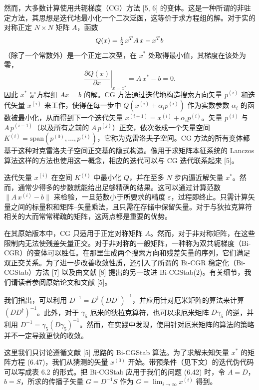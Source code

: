 然而，大多数计算使用共轭梯度（CG）方法 [5, 6] 的变体。这是一种所谓的非驻定方法，其思想是迭代地最小化一个二次泛函，这等价于求方程组的解。对于实的对称正定 $N\times N$ 矩阵 $A$，函数
\begin{equation}
  Q(x) = \tfrac{1}{2}\, x^T A\, x - x^T b
\end{equation}
（除了一个常数外）是一个正定二次型，在 $x^*$ 处取得最小值，其梯度在该处为零，
\begin{equation}
  \left.\frac{\partial Q(x)}{\partial x}\right|_{x = x^*}
  = A\, x^* - b = 0 .
\end{equation}
因此 $x^*$ 是方程组 $Ax = b$ 的解。CG 方法通过迭代地构造搜索方向矢量 $p^{(i)}$ 和迭代矢量 $x^{(i)}$ 来工作，使得在每一步中 $Q(x^{(i)} + \alpha_i p^{(i)})$ 作为实数参数 $\alpha_i$ 的函数被最小化，从而得到下一个迭代矢量 $x^{(i+1)} = x^{(i)} + \alpha_i p^{(i)}$。矢量 $p^{(i)}$ 与 $A\,p^{(i-1)}$（以及所有之前的 $A\,p^{(j)}$）正交，依次张成一个矢量空间 $K^{(i)} = \mathrm{span}(p^{(0)}, \ldots, p^{(i)})$，它称为克雷洛夫子空间。CG 方法的所有变体都基于这种对克雷洛夫子空间正交基的隐式构造。像用于求矩阵本征系统的 Lanczos 算法这样的方法也使用这一概念，相应的迭代可以与 CG 迭代联系起来 [5]。

迭代矢量 $x^{(i)}$ 在空间 $K^{(i)}$ 中最小化 $Q$，并在至多 $N$ 步内逼近解矢量 $x^*$。然而，通常少得多的步数就能给出足够精确的结果。这可以通过计算范数 $\|A\,x^{(i)} - b\|$ 来检验，一旦范数小于所要求的精度 $\varepsilon$，过程即终止。只需计算矢量之间的标量积和矩阵–矢量乘法，且只需在存储中保留矢量。对于与狄拉克算符相关的大而常常稀疏的矩阵，这两点都是重要的优势。

在其原始版本中，CG 只适用于正定对称矩阵 $A$。然而，对于非对称矩阵，在这些限制内无法使残差矢量正交。对于非对称的一般矩阵，一种称为双共轭梯度（Bi-CGR）的变体可以胜任。在那里生成两个搜索方向和残差矢量的序列，它们满足双正交关系。为了进一步改善收敛性质，还引入了所谓的 Bi-CGR 稳定化（Bi-CGStab）方法 [7] 以及由文献 [8] 提出的另一改进 Bi-CGStab(2)。有关细节，我们请读者参阅原始论文和文献 [5]。

我们指出，可以利用 $D^{-1} = D^\dagger(D D^\dagger)^{-1}$，并应用针对厄米矩阵的算法来计算 $(D D^\dagger)^{-1}$。此外，对于 $\gamma_5$ 厄米的狄拉克算符，也可以求厄米矩阵 $D\gamma_5$ 的逆，并利用 $D^{-1} = \gamma_5 (D\gamma_5)^{-1}$。然而，在实践中发现，使用针对厄米矩阵的算法的策略并不一定导致更快的收敛。

这里我们只讨论遵循文献 [5] 思路的 Bi-CGStab 算法。为了求解未知矢量 $x^*$ 的矩阵方程 (6.47)，我们从猜测的矢量 $x^{(0)}$ 开始。带预条件（见下文）的迭代伪代码可以写成表 6.2 的形式。把 Bi-CGStab 应用于我们的问题 (6.42) 时，令 $A = D$，$b = S$，所求的传播子矢量 $G = D^{-1}S$ 作为 $G = \lim_{i\to\infty} x^{(i)}$ 得到。

